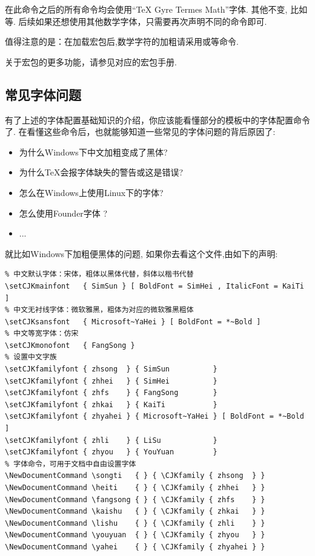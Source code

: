 在此命令之后的所有\cmd{\mathscr, \mathbfscr}命令均会使用``TeX Gyre Termes Math''字体. 其他不变, 比如\cmd{\mathrm, \mathbf}等.
后续如果还想使用其他数学字体，只需要再次声明不同的\cmd{\setmathfont}命令即可.

\begin{leftbar}
值得注意的是：在加载宏包后,数学字符的加粗请采用\cmd{\boldsymbol}或\cmd{\symbf, \symbfit, \symbfup}等命令.
\end{leftbar}

关于宏包的更多功能，请参见对应的宏包手册. 


\subsection{常见字体问题}
有了上述的字体配置基础知识的介绍，你应该能看懂部分的模板中的字体配置命令了. 在看懂这些命令后，也就能够知道一些常见的字体问题的背后原因了:
\begin{itemize}
    \item 为什么Windows下中文加粗变成了黑体?
    \item 为什么\TeX{}会报字体缺失的警告或这是错误?
    \item 怎么在Windows上使用Linux下的字体?
    \item 怎么使用Founder字体 ?
    \item ...
\end{itemize}

就比如Windows下加粗便黑体的问题,
如果你去看这个文件,由如下的声明:
\begin{verbatim}
% 中文默认字体：宋体，粗体以黑体代替，斜体以楷书代替
\setCJKmainfont   { SimSun } [ BoldFont = SimHei , ItalicFont = KaiTi ]
% 中文无衬线字体：微软雅黑，粗体为对应的微软雅黑粗体
\setCJKsansfont   { Microsoft~YaHei } [ BoldFont = *~Bold ]
% 中文等宽字体：仿宋
\setCJKmonofont   { FangSong }
% 设置中文字族
\setCJKfamilyfont { zhsong  } { SimSun          }
\setCJKfamilyfont { zhhei   } { SimHei          }
\setCJKfamilyfont { zhfs    } { FangSong        }
\setCJKfamilyfont { zhkai   } { KaiTi           }
\setCJKfamilyfont { zhyahei } { Microsoft~YaHei } [ BoldFont = *~Bold ]
\setCJKfamilyfont { zhli    } { LiSu            }
\setCJKfamilyfont { zhyou   } { YouYuan         }
% 字体命令，可用于文档中自由设置字体
\NewDocumentCommand \songti   { } { \CJKfamily { zhsong  } }
\NewDocumentCommand \heiti    { } { \CJKfamily { zhhei   } }
\NewDocumentCommand \fangsong { } { \CJKfamily { zhfs    } }
\NewDocumentCommand \kaishu   { } { \CJKfamily { zhkai   } }
\NewDocumentCommand \lishu    { } { \CJKfamily { zhli    } }
\NewDocumentCommand \youyuan  { } { \CJKfamily { zhyou   } }
\NewDocumentCommand \yahei    { } { \CJKfamily { zhyahei } }
\end{verbatim}

